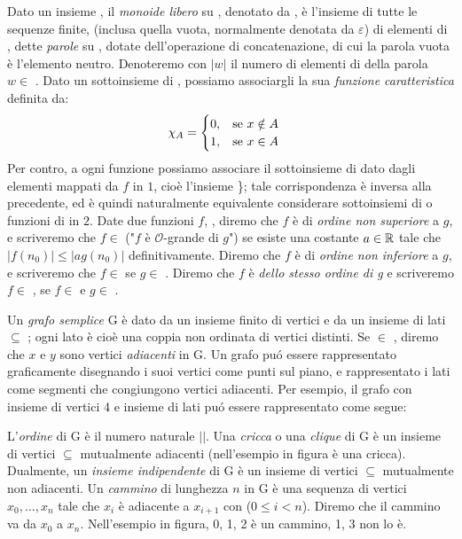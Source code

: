 Dato un insieme , il \textit{monoide libero} su , denotato da , è l'insieme di tutte le sequenze finite, (inclusa quella vuota, normalmente denotata da $\varepsilon$) di elementi di , dette \textit{parole} su , dotate dell'operazione di concatenazione, di cui la parola vuota è l'elemento neutro. Denoteremo con $|w|$ il numero di elementi di  della parola $w \in$ .
Dato un sottoinsieme  di , possiamo associargli la sua \textit{funzione caratteristica}  definita da:
\begin{equation}
    \chi_A =
    \begin{cases}
        0, \hspace{3mm} \textnormal{se } x \notin A \\
        1, \hspace{3mm} \textnormal{se } x \in A \\
    \end{cases}
\end{equation}
Per contro, a ogni funzione  possiamo associare il sottoinsieme di  dato dagli elementi mappati da $f$ in $1$, cioè l'insieme \}; tale corrispondenza è inversa alla precedente, ed è quindi naturalmente equivalente considerare sottoinsiemi di  o funzioni di  in $2$.
Date due funzioni $f$, , diremo che $f$ è di \textit{ordine non superiore} a $g$, e scriveremo che $f \in$  ("$f$ è $\mathcal{O}$-grande di $g$") se esiste una costante $a \in \mathbb{R}$ tale che $|f(n_0)| \leq |a g(n_0)|$ definitivamente. Diremo che $f$ è di \textit{ordine non inferiore} a $g$, e scriveremo che $f \in$  se $g \in$ . Diremo che $f$ è \textit{dello stesso ordine di g} e scriveremo $f \in$ , se $f \in$  e $g \in$ .

Un \textit{grafo semplice} G è dato da un insieme finito di vertici  e da un insieme di lati  $\subseteq$ ; ogni lato è cioè una coppia non ordinata di vertici distinti. Se  $\in$ , diremo che $x$ e $y$ sono vertici \textit{adiacenti} in G. Un grafo puó essere rappresentato graficamente disegnando i suoi vertici come punti sul piano, e rappresentato i lati come segmenti che congiungono vertici adiacenti. Per esempio, il grafo con insieme di vertici 4 e insieme di lati   puó essere rappresentato come segue:

L'\textit{ordine} di G è il numero naturale $|$$|$. Una \textit{cricca} o una \textit{clique} di G è un insieme di vertici  $\subseteq$  mutualmente adiacenti (nell'esempio in figura  è una cricca). Dualmente, un \textit{insieme indipendente} di G è un insieme di vertici  $\subseteq$  mutualmente non adiacenti. Un \textit{cammino} di lunghezza $n$ in G è una sequenza di vertici $x_0, \dots, x_{n}$ tale che $x_i$ è adiacente a $x_{i + 1}$ con ($0 \leq i < n$). Diremo che il cammino va da $x_0$ a $x_{n}$. Nell'esempio in figura, 0, 1, 2 è un cammino, 1, 3 non lo è.

